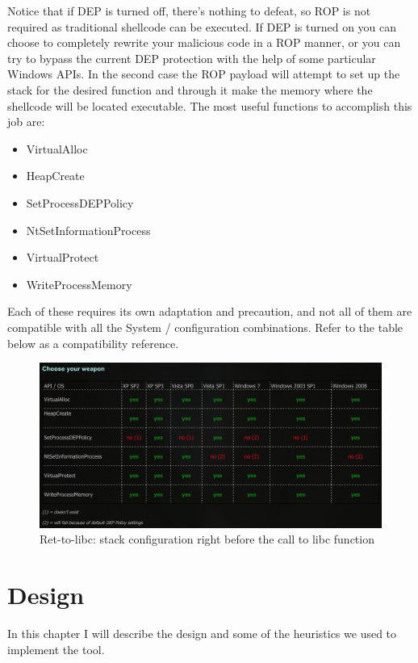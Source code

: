 \documentclass[Lau,binding=0.6cm]{sapthesis}
\begin{document}
Notice that if DEP is turned off, there’s nothing to defeat, so ROP is not required as traditional shellcode can be executed. If DEP is turned on you can choose to completely rewrite your malicious code in a ROP manner, or you can try to bypass the current DEP protection with the help of some particular Windows APIs. In the second case the ROP payload will attempt to set up the stack for the desired function and through it make the memory where the shellcode will be located executable. The most useful functions to accomplish this job are:
\begin{itemize}

\item VirtualAlloc
\item HeapCreate
\item SetProcessDEPPolicy
\item NtSetInformationProcess
\item VirtualProtect
\item WriteProcessMemory

\end{itemize}

Each of these requires its own adaptation and precaution, and not all of them are compatible with all the System / configuration combinations. Refer to the table below as a compatibility reference.

\begin{figure}
\centering
\includegraphics[width=1\textwidth]{windepapi}
\caption{Ret-to-libc: stack configuration right before the call to libc function}
\label{fig:largenenough}
\end{figure}

\chapter{Design}

In this chapter I will describe the design and some of the heuristics we used to implement the tool.
\end{document}
